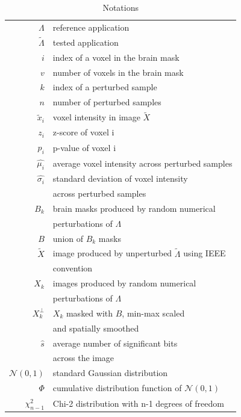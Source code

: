\documentclass[lettersize,journal]{IEEEtran}
\begin{document}
\begin{table}
  \centering
  \begin{tabular}{r|l}
    $\Lambda$          & reference application                                     \\
    $\tilde \Lambda$   & tested application                                        \\
    $i$                & index of a voxel in the brain mask                        \\
    $v$                & number of voxels in the brain mask                        \\
    $k$                & index of a perturbed sample                               \\
    $n$                & number of perturbed samples                               \\
    $\tilde x_i$       & voxel intensity in image $\tilde X$                       \\
    $z_i$              & z-score of voxel i                                        \\
    $p_i$              & p-value of voxel i                                        \\
    $\hat{\mu_i}$      & average voxel intensity across perturbed samples          \\
    $\hat{\sigma_i}$   & standard deviation of voxel intensity                     \\ & across perturbed samples       \\
    $B_k$              & brain masks produced by random numerical                  \\ & perturbations of $\Lambda$  \\
    $B$                & union of $B_k$ masks                                      \\
    $\tilde X$         & image produced by unperturbed $\tilde \Lambda$ using IEEE \\ & convention \\
    $X_k$              & images produced by random numerical                       \\ &  perturbations of $\Lambda$       \\
    $X_k^{\perp}$      & $X_k$ masked with $B$, min-max scaled                     \\ &  and spatially smoothed         \\
    $\hat{s}$          & average number of significant bits                        \\ & across the image \\
    $\mathcal{N}(0,1)$ & standard Gaussian distribution                            \\
    $\Phi$             & cumulative distribution function of $\mathcal{N}(0,1)$    \\
    $\chi^2_{n-1}$     & Chi-2 distribution with n-1 degrees of freedom            \\
  \end{tabular}
  \caption{Notations}
  \label{tab:notations}
\end{table}
\end{document}
